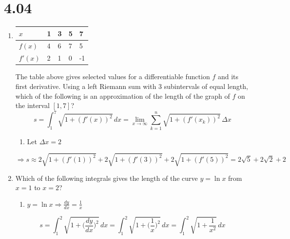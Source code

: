 \documentclass[12pt]{article}
\begin{document}
\section*{4.04}
\begin{enumerate}
    \item 
        \begin{table}[h]
        \centering
        \begin{tabular}{|l||l|l|l|l|}
        \hline
        $x$ & 1 & 3 & 5 & 7 \\ \hline
        $f(x)$ & 4 & 6 & 7 & 5 \\ \hline
        $f'(x)$ & 2 & 1 & 0 & -1 \\ \hline
        \end{tabular}
        \end{table}
        The table above gives selected values for a differentiable function $f$ and its first derivative. Using a left Riemann sum with 3 subintervals of equal length, which of the following is an approximation of the length of the graph of $f$ on the interval $[1,7]$?
$$s=\int_{1}^{7}\sqrt{1+(f'(x))^2} \, dx = \lim_{x\to\infty}\sum_{k=1}^{n} \sqrt{1+(f'(x_k))^2} \,  \Delta x$$
\begin{enumerate}
    \item Let $\Delta x = 2$
\end{enumerate}
$$\Longrightarrow s \approx  2\sqrt{1+(f'(1))^2} + 2 \sqrt{1+(f'(3))^2} + 2\sqrt{1+(f'(5))^2} = \boxed{2\sqrt{5}+2\sqrt{2}+2}$$
        \item Which of the following integrals gives the length of the curve $y=\ln x$ from $x=1$ to $x=2$?
        \begin{enumerate}
            \item $y=\ln x \Longrightarrow \frac{dy}{dx} = \frac{1}{x}$
        \end{enumerate}
        $$s= \int_{1}^{2} \sqrt{1+\bigg(\frac{dy}{dx}\bigg)^2} \, dx = \int_{1}^{2} \sqrt{1+\bigg(\frac{1}{x}\bigg)^2} \, dx= \boxed{\int_{1}^{2} \sqrt{1+\frac{1}{x^2}}\, dx}$$


\end{enumerate}
\end{document}
